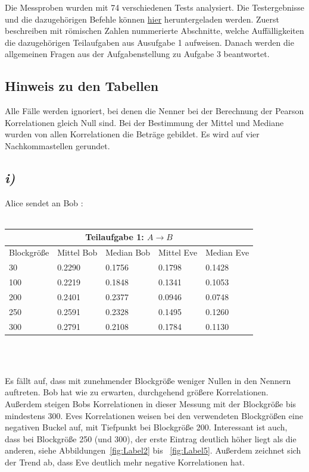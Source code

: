 \documentclass[12pt,a4paper]{article}
\begin{document}
Die Messproben wurden mit 74 verschiedenen Tests analysiert. Die Testergebnisse 
und die dazugehörigen Befehle können 
\href{https://mega.nz/file/rg4HzTJB#4DSJFln2TZiz9BZ_8xZObXRsGiheQ3Otaf_7wMUAqTQ}
{hier} 
heruntergeladen werden. Zuerst beschreiben mit römischen Zahlen nummerierte
Abschnitte, welche Auffälligkeiten die dazugehörigen Teilaufgaben aus
Ausufgabe 1 aufweisen. Danach werden die allgemeinen Fragen aus der 
Aufgabenstellung zu Aufgabe 3 beantwortet.


\subsection*{Hinweis zu den Tabellen}

Alle Fälle werden ignoriert, bei denen die Nenner bei der 
Berechnung der Pearson Korrelationen gleich Null sind. 
Bei der Bestimmung der Mittel und Mediane wurden von allen 
Korrelationen die Beträge gebildet. Es wird auf vier 
Nachkommastellen gerundet.


\subsection*{\textit{i)}}


Alice sendet an Bob :\\~\\


\Large
\begin{tabular}{ |p{3cm}|||p{3cm}|p{3cm}||p{3cm}|p{3cm}|}
    \hline
    \multicolumn{5}{|c|}{Teilaufgabe 1: $A\rightarrow B$} \\
    \hline
    Blockgröße & Mittel Bob & Median Bob & Mittel Eve & Median Eve\\
    \hline
    \hspace{3.2mm}30 & 0.2290 & 0.1756 & 0.1798 & 0.1428\\
    100 & 0.2219 & 0.1848 & 0.1341 & 0.1053\\
    200 & 0.2401 & 0.2377 & 0.0946 & 0.0748\\
    250 & 0.2591 & 0.2328 & 0.1495 & 0.1260\\
    300 & 0.2791 & 0.2108 & 0.1784 & 0.1130\\
    \hline
\end{tabular}
\\[0.7cm]\\
\normalsize

Es fällt auf, dass mit zunehmender Blockgröße weniger Nullen in den 
Nennern auftreten. Bob hat wie zu erwarten, durchgehend größere 
Korrelationen. Außerdem steigen Bobs Korrelationen in dieser Messung 
mit der Blockgröße bis mindestens 300. Eves Korrelationen weisen
bei den verwendeten Blockgrößen eine negativen Buckel auf, mit 
Tiefpunkt bei Blockgröße 200. Interessant ist auch, dass bei 
Blockgröße 250 (und 300), der erste Eintrag deutlich höher liegt 
als die anderen, siehe Abbildungen~\ref{fig:Label2} bis 
~\ref{fig:Label5}. Außerdem zeichnet sich 
der Trend ab, dass Eve deutlich mehr negative Korrelationen hat.
\end{document}
